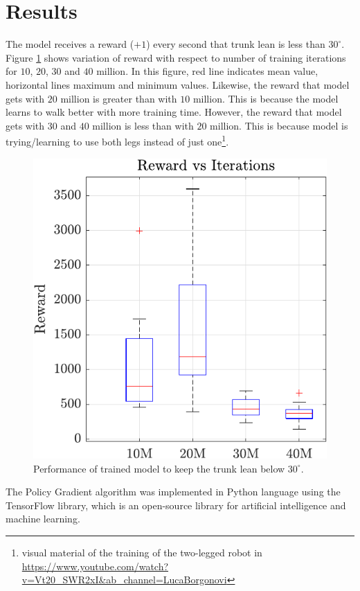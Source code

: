 \section{Results}
The model receives a reward ($+1$) every second that trunk lean is less than $30^{\circ}$. Figure \ref{fig:boxplot} shows variation of reward with respect to number of training iterations for $10$, $20$, $30$ and $40$ million. In this figure, red line indicates mean value, horizontal lines maximum and minimum values. Likewise, the reward that model gets with $20$ million is greater than with $10$ million. This is because the model learns to walk better with more training time. However, the reward that model gets with $30$ and $40$ million is less than with $20$ million. This is because model is trying/learning to use both legs instead of just one\footnote{visual material of the training of the two-legged robot in \url{https://www.youtube.com/watch?v=Vt20_SWR2xI&ab_channel=LucaBorgonovi}}.


\begin{figure}
	\centering
	\includegraphics{images/reward_vs_iter.pdf}
	\caption{Performance of trained model to keep the trunk lean below $30^{\circ}$.}
	\label{fig:boxplot}
\end{figure}


The Policy Gradient algorithm was implemented in Python language using the TensorFlow library, which is an open-source library for artificial intelligence and machine learning.

